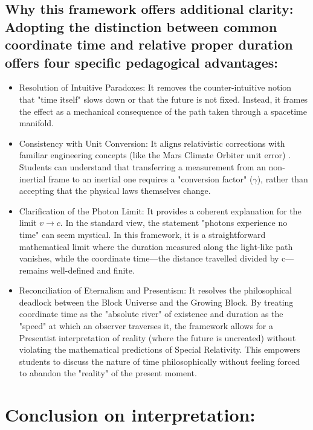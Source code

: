\documentclass[a4paper,fleqn]{cas-sc}
\begin{document}
	\subsection{ Why this framework offers additional clarity: Adopting the distinction between common coordinate time and relative proper duration offers four specific pedagogical advantages:}\label{subsec5_3}
		\begin{itemize}
			\item Resolution of Intuitive Paradoxes: It removes the counter-intuitive notion that "time itself" slows down or that the future is not fixed. Instead, it frames the effect as a mechanical consequence of the path taken through a spacetime manifold.
			\item Consistency with Unit Conversion: It aligns relativistic corrections with familiar engineering concepts (like the Mars Climate Orbiter unit error) \cite{nasa1999}. Students can understand that transferring a measurement from an non-inertial frame to an inertial one requires a "conversion factor" ($\gamma$), rather than accepting that the physical laws themselves change.
 			\item Clarification of the Photon Limit: It provides a coherent explanation for the limit $v \to c$. In the standard view, the statement "photons experience no time" can seem mystical. In this framework, it is a straightforward mathematical limit where the duration measured along the light-like path vanishes, while the coordinate time—the distance travelled divided by c—remains well-defined and finite.
 			\item Reconciliation of Eternalism and Presentism: It resolves the philosophical deadlock between the Block Universe and the Growing Block. By treating coordinate time as the "absolute river" of existence and duration as the "speed" at which an observer traverses it, the framework allows for a Presentist interpretation of reality (where the future is uncreated) without violating the mathematical predictions of Special Relativity. This empowers students to discuss the nature of time philosophically without feeling forced to abandon the "reality" of the present moment.
		\end{itemize}
\section{ Conclusion on interpretation:}\label{sec6}
\end{document}
